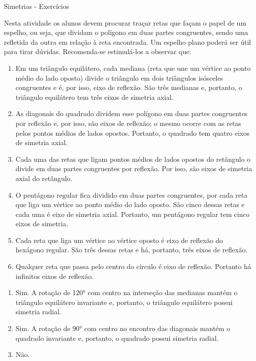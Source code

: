 \begin{sugestions}{Simetrias - Exercícios}
{

Nesta atividade os alunos devem procurar traçar retas que façam o papel de um espelho, ou seja, que dividam o polígono em duas partes congruentes, sendo uma refletida da outra em relação à reta encontrada. Um espelho plano poderá ser útil para tirar dúvidas. Recomenda-se estimulá-los a observar que: 
\begin{enumerate}[label=\textit{\alph*)}]
\item Em um triângulo equilátero, cada mediana (reta que une um vértice ao ponto médio do lado oposto) divide o triângulo em dois triângulos isósceles congruentes e é, por isso, eixo de reflexão. São três medianas e, portanto, o triângulo equilátero tem três eixos de simetria axial. 
\item As diagonais do quadrado dividem esse polígono em duas partes congruentes por reflexão e, por isso, são eixos de reflexão; o mesmo ocorre com as retas pelos pontos médios de lados opostos. Portanto, o quadrado tem quatro eixos de simetria axial.
\item Cada uma das retas que ligam pontos médios de lados opostos do retângulo o divide em duas partes congruentes por reflexão. Por isso, são eixos de simetria axial do retângulo.
\item O pentágono regular fica dividido em duas partes congruentes, por cada reta que liga um vértice ao ponto médio do lado oposto. São cinco dessas retas e cada uma é eixo de simetria axial. Portanto, um pentágono regular tem cinco eixos de simetria.
\item Cada reta que liga um vértice ao vértice oposto é eixo de reflexão do hexágono regular. São três dessas retas e há, portanto, três eixos de reflexão.
\item Qualquer reta que passa pelo centro do círculo é eixo de reflexão. Portanto há infinitos eixos de reflexão.
\end{enumerate}
\begin{enumerate}[label=\textit{\alph*)}]
\item Sim. A rotação de 120° com centro na interseção das medianas mantém o triângulo equilátero invariante e, portanto, o triângulo equilátero possui simetria radial.
\item Sim. A rotação de 90° com centro no encontro das diagonais mantém o quadrado invariante e, portanto, o quadrado possui simetria radial. 
\item Não.

\end{enumerate}}
\end{sugestions}
